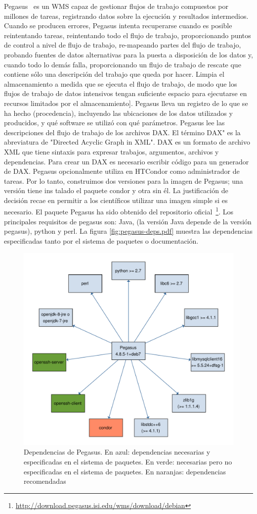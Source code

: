 Pegasus~\cite{} es un WMS capaz de gestionar flujos de trabajo compuestos por millones de tareas, registrando datos sobre la ejecución y resultados intermedios. 
Cuando se producen errores, Pegasus intenta recuperarse cuando es posible reintentando tareas, reintentando todo el flujo de trabajo, proporcionando puntos de control a nivel de flujo de trabajo, re-mapeando partes del flujo de trabajo, probando fuentes de datos alternativas para la puesta a disposición de los datos y, cuando todo lo demás falla, proporcionando un flujo de trabajo de rescate que contiene sólo una descripción del trabajo que queda por hacer. Limpia el almacenamiento a medida que se ejecuta el flujo de trabajo, de modo que los flujos de trabajo de datos intensivos tengan suficiente espacio para ejecutarse en recursos limitados por el almacenamiento]. Pegasus lleva un registro de lo que se ha hecho (procedencia), incluyendo las ubicaciones de los datos utilizados y producidos, y qué software se utilizó con qué parámetros.
Pegasus lee las descripciones del flujo de trabajo de los archivos DAX. El término DAX" es la abreviatura de "Directed Acyclic Graph in XML". DAX es un formato de archivo XML que tiene sintaxis para expresar trabajos, argumentos, archivos y dependencias. Para crear un DAX es necesario escribir código para un generador de DAX. 
Pegasus opcionalmente utiliza en HTCondor como administrador de tareas. Por lo tanto, construimos dos versiones para la imagen de Pegasus; una versión tiene ins
talado el paquete condor y otra sin él. La justificación de decisión recae en permitir a los científicos utilizar una imagen simple si es necesario.
El paquete Pegasus ha sido obtenido del repositorio oficial~\footnote{\url{http://download.pegasus.isi.edu/wms/download/debian}}.
Los principales requisitos de pegasus son: Java,  (la versión Java depende de la versión pegasus), python y perl. La figura \ref{fig:pegasus-deps.pdf} muestra las dependencias especificadas tanto por el sistema de paquetes o documentación.

\begin{figure}[t]
\centering
\includegraphics[width=.5\textwidth]{Figures/pegasus-deps}
\caption{Dependencias de Pegasus. En azul: dependencias necesarias y especificadas en el sistema de paquetes. En verde: necesarias pero no especificadas en el sistema de paquetes. En naranjas: dependencias recomendadas}\label{fig:pegasus-deps}
\end{figure}

